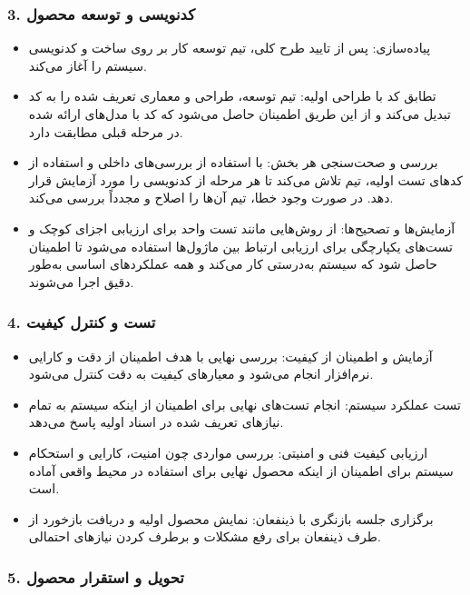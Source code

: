 \subsubsection*{3. کدنویسی و توسعه محصول}

\begin{itemize}
    \item 
    پیاده‌سازی: پس از تایید طرح کلی، تیم توسعه کار بر روی ساخت و کدنویسی سیستم را آغاز می‌کند.
    \item 
    تطابق کد با طراحی اولیه: تیم توسعه، طراحی و معماری تعریف شده را به کد تبدیل می‌کند و از این طریق اطمینان حاصل می‌شود که کد با مدل‌های ارائه شده در مرحله قبلی مطابقت دارد.
    \item 
    بررسی و صحت‌سنجی هر بخش: با استفاده از بررسی‌های داخلی و استفاده از کدهای تست اولیه، تیم تلاش می‌کند تا هر مرحله از کدنویسی را مورد آزمایش قرار دهد. در صورت وجود خطا، تیم آن‌ها را اصلاح و مجدداً بررسی می‌کند.
    \item 
    آزمایش‌ها و تصحیح‌ها: از روش‌هایی مانند تست واحد برای ارزیابی اجزای کوچک و تست‌های یکپارچگی برای ارزیابی ارتباط بین ماژول‌ها استفاده می‌شود تا اطمینان حاصل شود که سیستم به‌درستی کار می‌کند و همه عملکردهای اساسی به‌طور دقیق اجرا می‌شوند.
\end{itemize}


\subsubsection*{4. تست و کنترل کیفیت}

\begin{itemize}
    \item 
    آزمایش و اطمینان از کیفیت: بررسی نهایی با هدف اطمینان از دقت و کارایی نرم‌افزار انجام می‌شود و معیارهای کیفیت به دقت کنترل می‌شود.
    \item 
    تست عملکرد سیستم: انجام تست‌های نهایی برای اطمینان از اینکه سیستم به تمام نیازهای تعریف شده در اسناد اولیه پاسخ می‌دهد.
    \item 
    ارزیابی کیفیت فنی و امنیتی: بررسی مواردی چون امنیت، کارایی و استحکام سیستم برای اطمینان از اینکه محصول نهایی برای استفاده در محیط واقعی آماده است.
    \item 
    برگزاری جلسه بازنگری با ذینفعان: نمایش محصول اولیه و دریافت بازخورد از طرف ذینفعان برای رفع مشکلات و برطرف کردن نیازهای احتمالی.
\end{itemize}

\subsubsection*{5. تحویل و استقرار محصول}

